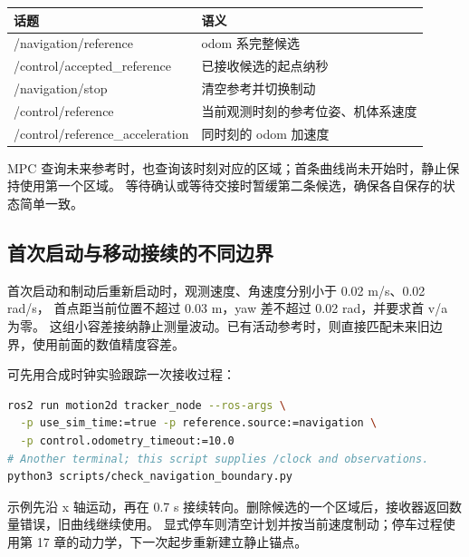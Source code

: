 \begin{center}\begin{minipage}{\linewidth}\makeatletter{}\makeatother
\centering{}
\caption{确认与开始执行分开。候选在未来起点之前通过接收检查；确认携带该起点，规划端据此匹配自己的待确认计划。}
\end{minipage}\end{center}

\begin{center}\small
\begin{tabular}{ll}\toprule
话题 & 语义\\\midrule
/navigation/reference & odom 系完整候选\\
/control/accepted\_reference & 已接收候选的起点纳秒\\
/navigation/stop & 清空参考并切换制动\\
/control/reference & 当前观测时刻的参考位姿、机体系速度\\
/control/reference\_acceleration & 同时刻的 odom 加速度\\\bottomrule
\end{tabular}\end{center}
MPC 查询未来参考时，也查询该时刻对应的区域；首条曲线尚未开始时，静止保持使用第一个区域。
等待确认或等待交接时暂缓第二条候选，确保各自保存的状态简单一致。

\subsection{首次启动与移动接续的不同边界}
首次启动和制动后重新启动时，观测速度、角速度分别小于 0.02 m/s、0.02 rad/s，
首点距当前位置不超过 0.03 m，yaw 差不超过 0.02 rad，并要求首 v/a 为零。
这组小容差接纳静止测量波动。已有活动参考时，则直接匹配未来旧边界，使用前面的数值精度容差。

可先用合成时钟实验跟踪一次接收过程：
\begin{lstlisting}[language=bash,numbers=none]
ros2 run motion2d tracker_node --ros-args \
  -p use_sim_time:=true -p reference.source:=navigation \
  -p control.odometry_timeout:=10.0
# Another terminal; this script supplies /clock and observations.
python3 scripts/check_navigation_boundary.py
\end{lstlisting}
示例先沿 x 轴运动，再在 0.7 s 接续转向。删除候选的一个区域后，接收器返回数量错误，旧曲线继续使用。
显式停车则清空计划并按当前速度制动；停车过程使用第 17 章的动力学，下一次起步重新建立静止锚点。

